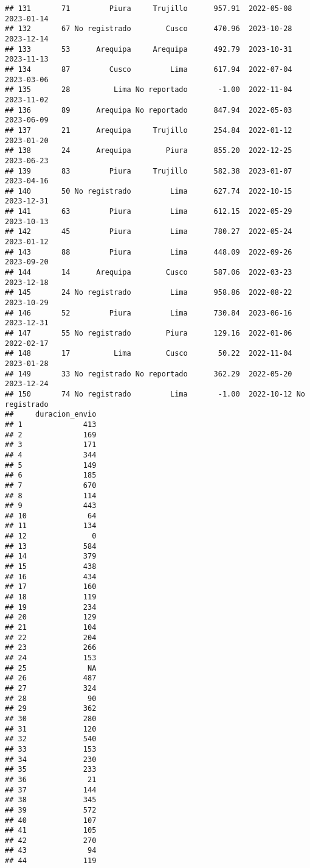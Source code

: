 \documentclass[
]{article}
\begin{document}
\begin{verbatim}
## 131       71         Piura     Trujillo      957.91  2022-05-08    2023-01-14
## 132       67 No registrado        Cusco      470.96  2023-10-28    2023-12-14
## 133       53      Arequipa     Arequipa      492.79  2023-10-31    2023-11-13
## 134       87         Cusco         Lima      617.94  2022-07-04    2023-03-06
## 135       28          Lima No reportado       -1.00  2022-11-04    2023-11-02
## 136       89      Arequipa No reportado      847.94  2022-05-03    2023-06-09
## 137       21      Arequipa     Trujillo      254.84  2022-01-12    2023-01-20
## 138       24      Arequipa        Piura      855.20  2022-12-25    2023-06-23
## 139       83         Piura     Trujillo      582.38  2023-01-07    2023-04-16
## 140       50 No registrado         Lima      627.74  2022-10-15    2023-12-31
## 141       63         Piura         Lima      612.15  2022-05-29    2023-10-13
## 142       45         Piura         Lima      780.27  2022-05-24    2023-01-12
## 143       88         Piura         Lima      448.09  2022-09-26    2023-09-20
## 144       14      Arequipa        Cusco      587.06  2022-03-23    2023-12-18
## 145       24 No registrado         Lima      958.86  2022-08-22    2023-10-29
## 146       52         Piura         Lima      730.84  2023-06-16    2023-12-31
## 147       55 No registrado        Piura      129.16  2022-01-06    2022-02-17
## 148       17          Lima        Cusco       50.22  2022-11-04    2023-01-28
## 149       33 No registrado No reportado      362.29  2022-05-20    2023-12-24
## 150       74 No registrado         Lima       -1.00  2022-10-12 No registrado
##     duracion_envio
## 1              413
## 2              169
## 3              171
## 4              344
## 5              149
## 6              185
## 7              670
## 8              114
## 9              443
## 10              64
## 11             134
## 12               0
## 13             584
## 14             379
## 15             438
## 16             434
## 17             160
## 18             119
## 19             234
## 20             129
## 21             104
## 22             204
## 23             266
## 24             153
## 25              NA
## 26             487
## 27             324
## 28              90
## 29             362
## 30             280
## 31             120
## 32             540
## 33             153
## 34             230
## 35             233
## 36              21
## 37             144
## 38             345
## 39             572
## 40             107
## 41             105
## 42             270
## 43              94
## 44             119

\end{verbatim}
\end{document}

